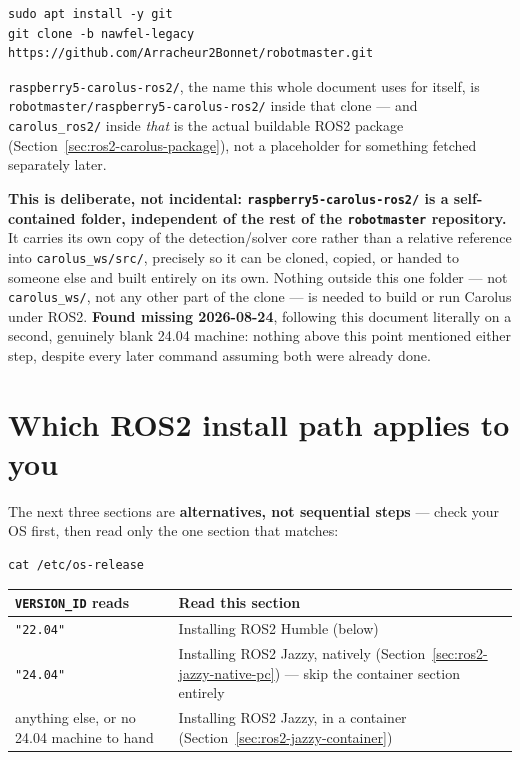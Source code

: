 \documentclass[11pt]{report}
\begin{document}
\begin{lstlisting}[style=shell]
sudo apt install -y git
git clone -b nawfel-legacy https://github.com/Arracheur2Bonnet/robotmaster.git
\end{lstlisting}

\texttt{raspberry5-carolus-ros2/}, the name this whole document uses for
itself, is \texttt{robotmaster/\allowbreak raspberry5-carolus-ros2/} inside
that clone --- and \texttt{carolus\_ros2/} inside \emph{that} is the actual
buildable ROS2 package (Section~\ref{sec:ros2-carolus-package}), not a
placeholder for something fetched separately later.

\textbf{This is deliberate, not incidental: \texttt{raspberry5-carolus-ros2/}
is a self-contained folder, independent of the rest of the
\texttt{robotmaster} repository.} It carries its own copy of the
detection/solver core rather than a relative reference into
\texttt{carolus\_ws/src/}, precisely so it can be cloned, copied, or handed
to someone else and built entirely on its own. Nothing outside this one
folder --- not \texttt{carolus\_ws/}, not any other part of the clone --- is
needed to build or run Carolus under ROS2.
\textbf{Found missing 2026-08-24}, following this document literally on a
second, genuinely blank 24.04 machine: nothing above this point mentioned
either step, despite every later command assuming both were already done.

\section{Which ROS2 install path applies to you}
\label{sec:ros2-which-path}

The next three sections are \textbf{alternatives, not sequential steps} ---
check your OS first, then read only the one section that matches:

\begin{lstlisting}[style=shell]
cat /etc/os-release
\end{lstlisting}

\begin{center}
\begin{tabular}{ll}
\toprule
\texttt{VERSION\_ID} reads & Read this section \\
\midrule
\texttt{"22.04"} & Installing ROS2 Humble (below) \\
\texttt{"24.04"} & Installing ROS2 Jazzy, natively (Section~\ref{sec:ros2-jazzy-native-pc}) --- skip the container section entirely \\
anything else, or no 24.04 machine to hand & Installing ROS2 Jazzy, in a container (Section~\ref{sec:ros2-jazzy-container}) \\
\bottomrule
\end{tabular}
\end{center}
\end{document}
